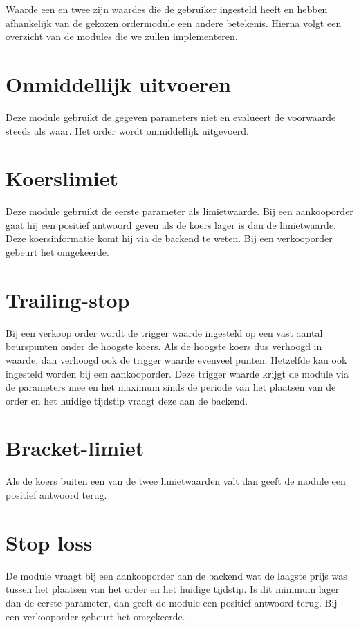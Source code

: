 Waarde een en twee zijn waardes die de gebruiker ingesteld heeft en hebben afhankelijk van de gekozen ordermodule een andere betekenis.
Hierna volgt een overzicht van de modules die we zullen implementeren.

\section{Onmiddellijk uitvoeren}
Deze module gebruikt de gegeven parameters niet en evalueert de voorwaarde steeds als waar. Het order wordt onmiddellijk uitgevoerd.

\section{Koerslimiet}
Deze module gebruikt de eerste parameter als limietwaarde. Bij een aankooporder gaat hij een positief antwoord geven als de koers lager is dan de limietwaarde. Deze koersinformatie komt hij via de backend te weten. Bij een verkooporder gebeurt het omgekeerde. 

\section{Trailing-stop}
Bij een verkoop order wordt de trigger waarde ingesteld op een vast aantal beurspunten onder de hoogste koers. Als de hoogste koers dus verhoogd in waarde, dan verhoogd ook de trigger waarde evenveel punten. Hetzelfde kan ook ingesteld worden bij een aankooporder. Deze trigger waarde krijgt de module via de parameters mee en het maximum sinds de periode van het plaatsen van de order en het huidige tijdstip vraagt deze aan de backend.

\section{Bracket-limiet}
Als de koers buiten een van de twee limietwaarden valt dan geeft de module een positief antwoord terug.

\section{Stop loss}
De module vraagt bij een aankooporder aan de backend wat de laagste prijs was tussen het plaatsen van het order en het huidige tijdstip. Is dit minimum lager dan de eerste parameter, dan geeft de module een positief antwoord terug. Bij een verkooporder gebeurt het omgekeerde.


%
%

